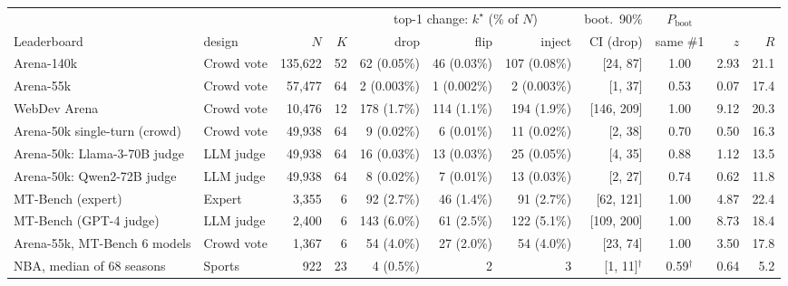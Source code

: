 \begin{tabular}{llrrrrrrcrr}
\toprule
& & & & \multicolumn{3}{c}{top-1 change: $k^\star$ (\% of $N$)} & boot.\ 90\% & $P_{\mathrm{boot}}$ & & \\
\cmidrule(lr){5-7}
Leaderboard & design & $N$ & $K$ & drop & flip & inject & CI (drop) & same \#1 & $z$ & $R$ \\
\midrule
Arena-140k & Crowd vote & 135,622 & 52 & 62 (0.05\%) & 46 (0.03\%) & 107 (0.08\%) & [24, 87] & 1.00 & 2.93 & 21.1 \\
Arena-55k & Crowd vote & 57,477 & 64 & 2 (0.003\%) & 1 (0.002\%) & 2 (0.003\%) & [1, 37] & 0.53 & 0.07 & 17.4 \\
WebDev Arena & Crowd vote & 10,476 & 12 & 178 (1.7\%) & 114 (1.1\%) & 194 (1.9\%) & [146, 209] & 1.00 & 9.12 & 20.3 \\
Arena-50k single-turn (crowd) & Crowd vote & 49,938 & 64 & 9 (0.02\%) & 6 (0.01\%) & 11 (0.02\%) & [2, 38] & 0.70 & 0.50 & 16.3 \\
Arena-50k: Llama-3-70B judge & LLM judge & 49,938 & 64 & 16 (0.03\%) & 13 (0.03\%) & 25 (0.05\%) & [4, 35] & 0.88 & 1.12 & 13.5 \\
Arena-50k: Qwen2-72B judge & LLM judge & 49,938 & 64 & 8 (0.02\%) & 7 (0.01\%) & 13 (0.03\%) & [2, 27] & 0.74 & 0.62 & 11.8 \\
MT-Bench (expert) & Expert & 3,355 & 6 & 92 (2.7\%) & 46 (1.4\%) & 91 (2.7\%) & [62, 121] & 1.00 & 4.87 & 22.4 \\
MT-Bench (GPT-4 judge) & LLM judge & 2,400 & 6 & 143 (6.0\%) & 61 (2.5\%) & 122 (5.1\%) & [109, 200] & 1.00 & 8.73 & 18.4 \\
Arena-55k, MT-Bench 6 models & Crowd vote & 1,367 & 6 & 54 (4.0\%) & 27 (2.0\%) & 54 (4.0\%) & [23, 74] & 1.00 & 3.50 & 17.8 \\
\midrule
NBA, median of 68 seasons & Sports & 922 & 23 & 4 (0.5\%) & 2 & 3 & [1, 11]$^\dagger$ & 0.59$^\dagger$ & 0.64 & 5.2 \\
\bottomrule
\end{tabular}
